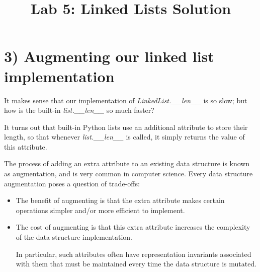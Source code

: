 \documentclass[12pt]{article}
\begin{document}
\title{Lab 5: Linked Lists Solution}
\date{}
\maketitle

\section*{3) Augmenting our linked list implementation}
It makes sense that our implementation of \textit{LinkedList.\_\_len\_\_} is so
slow; but how is the built-in \textit{list.\_\_len\_\_} so much faster?

\bigskip

\noindent It turns out that built-in Python lists use an additional attribute to
store their length, so that whenever \textit{list.\_\_len\_\_} is called, it simply
returns the value of this attribute.

\bigskip

\noindent The process of adding an extra attribute to an existing data structure
is known as augmentation, and is very common in computer science. Every data
structure augmentation poses a question of trade-offs:

\begin{itemize}
    \item The benefit of augmenting is that the extra attribute makes certain operations simpler and/or more efficient to implement.
    \item The cost of augmenting is that this extra attribute increases the complexity of the data structure implementation.

    In particular, such attributes often have representation invariants associated with them that must be maintained every time the data structure is mutated.
\end{itemize}

\bigskip
\end{document}
